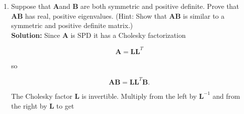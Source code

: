 \documentclass[11pt,fleqn]{article}
\begin{document}
\begin{enumerate}
{\bf Solution:} Suppose that $\mathbf{AB}\vec{v} = \lambda \vec{v}$ with $\vec{v}\neq \vec{0}$.
Multiply by $\mathbf{B}$: $\mathbf{BAB}\vec{v} = \lambda \mathbf{B}\vec{v}$.
Define $\vec{w} = \mathbf{B}\vec{v}$. Then
\[\mathbf{BA}\vec{w} = \lambda\vec{w}.\]
This equation only implies that $\lambda$ is an eigenvalue of {\bf BA} when $\vec{w}\neq\vec{0}$.
So what we've shown so far is
\begin{quote}
If {\bf AB} has eigenvalue $\lambda$ and eigenvector $\vec{v}$ then {\bf BA} also has eigenvector $\lambda$ provided that $\mathbf{B}\vec{v}\neq \vec{0}$.
\end{quote}
So what happens when $\vec{v}\neq\vec{0}$ but $\mathbf{B}\vec{v} = \vec{0}$?
In that case $\lambda=0$ must be an eigenvalue of {\bf AB} because $\mathbf{AB}\vec{v} = \mathbf{A}\vec{0} = \vec{0} = (0)\vec{v}$.
So we can conclude at this point that
\begin{quote}
If {\bf AB} has eigenvalue $\lambda\neq 0$ and eigenvector $\vec{v}$ then {\bf BA} also has eigenvector $\lambda$.
\end{quote}
By re-labeling {\bf A} and {\bf B} we find that
\begin{quote}
The nonzero eigenvalues of {\bf AB} and {\bf BA} are the same.
\end{quote}

To complete the proof we need to show that if $\lambda=0$ is an eigenvalue of {\bf AB} then it must also be an eigenvalue of {\bf BA}.
Clearly if {\bf A} and {\bf B} are both invertible then it's not possible for $\lambda=0$ to be an eigenvalue of {\bf AB} or {\bf BA}.
If at least one of the factors is singular then the product is also singular, meaning that it has a zero eigenvalue regardless of the order of the factors.
This completes the proof.

\item Suppose that $\mathbf{A}$and $\mathbf{B}$ are both symmetric and positive definite. Prove that $\mathbf{AB}$ has real, positive eigenvalues. (Hint: Show that {\bf AB} is similar to a symmetric and positive definite matrix.)\\

{\bf Solution:} Since $\mathbf{A}$ is SPD it has a Cholesky factorization

\[\mathbf{A} = \mathbf{LL}^T\]

so

\[\mathbf{AB} = \mathbf{LL}^T\mathbf{B}.\]

The Cholesky factor $\mathbf{L}$ is invertible.
Multiply from the left by $\mathbf{L}^{-1}$ and from the right by $\mathbf{L}$ to get


\end{enumerate}
\end{document}
